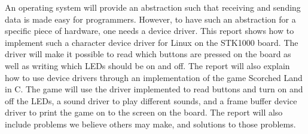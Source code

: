 An operating system will provide an abstraction such that receiving
and sending data is made easy for programmers. However, to have such an
abstraction for a specific piece of hardware, one needs a device driver.
This report shows how to implement such a character device driver for
Linux on the STK1000 board. The driver will make it possible to read
which buttons are pressed on the board as well as writing which LEDs
should be on and off. The report will also explain how to use device
drivers through an implementation of the game Scorched Land in C. The
game will use the driver implemented to read buttons and turn on and off
the LEDs, a sound driver to play different sounds, and a frame buffer
device driver to print the game on to the screen on the board. The
report will also include problems we believe others may make, and
solutions to those problems.
